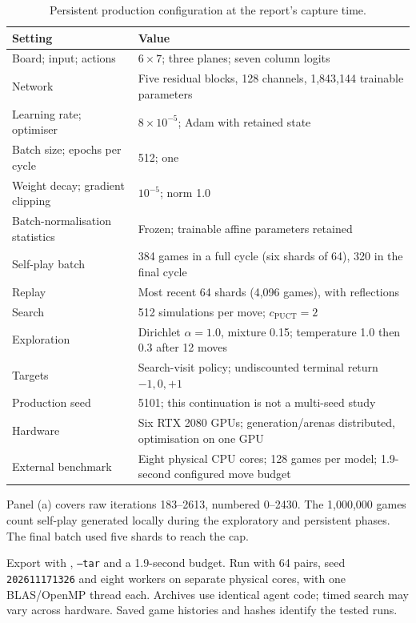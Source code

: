\documentclass[letterpaper]{article}
\begin{document}
\begin{table}[htbp]
\centering\small
\caption{Persistent production configuration at the report's capture time.}
\begin{tabular}{@{}p{.38\linewidth}p{.56\linewidth}@{}}
\toprule
Setting & Value\\
\midrule
Board; input; actions & $6\times7$; three planes; seven column logits\\
Network & Five residual blocks, 128 channels, 1,843,144 trainable parameters\\
Learning rate; optimiser & $8\times10^{-5}$; Adam with retained state\\
Batch size; epochs per cycle & 512; one\\
Weight decay; gradient clipping & $10^{-5}$; norm 1.0\\
Batch-normalisation statistics & Frozen; trainable affine parameters retained\\
Self-play batch & 384 games in a full cycle (six shards of 64), 320 in the final cycle\\
Replay & Most recent 64 shards (4,096 games), with reflections\\
Search & 512 simulations per move; $c_{\mathrm{PUCT}}=2$\\
Exploration & Dirichlet $\alpha=1.0$, mixture 0.15; temperature 1.0 then 0.3 after 12 moves\\
Targets & Search-visit policy; undiscounted terminal return $-1,0,+1$\\
Production seed & 5101; this continuation is not a multi-seed study\\
Hardware & Six RTX 2080 GPUs; generation/arenas distributed, optimisation on one GPU\\
External benchmark & Eight physical CPU cores; 128 games per model; 1.9-second configured move budget\\
\bottomrule
\end{tabular}
\end{table}

Panel (a) covers raw iterations 183--2613, numbered 0--2430. The 1,000,000 games count self-play generated locally during the exploratory and persistent phases. The final batch used five shards to reach the cap.

Export with , \texttt{--tar} and a 1.9-second
budget. Run  with 64 pairs, seed
\texttt{202611171326} and eight workers on separate physical cores, with one
BLAS/OpenMP thread each. Archives use identical agent code; timed search may
vary across hardware. Saved game histories and hashes identify the tested runs.
\end{document}
